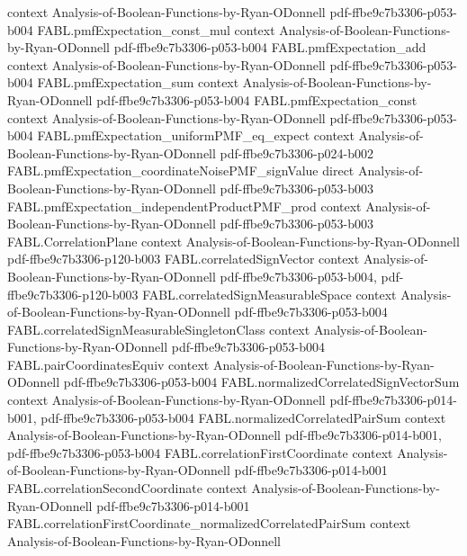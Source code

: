\begin{theorem}
  {context}
  {Analysis-of-Boolean-Functions-by-Ryan-ODonnell}
  {pdf-ffbe9c7b3306-p053-b004}
\proofstep
  {FABL.pmfExpectation_const_mul}
  {context}
  {Analysis-of-Boolean-Functions-by-Ryan-ODonnell}
  {pdf-ffbe9c7b3306-p053-b004}
\proofstep
  {FABL.pmfExpectation_add}
  {context}
  {Analysis-of-Boolean-Functions-by-Ryan-ODonnell}
  {pdf-ffbe9c7b3306-p053-b004}
\proofstep
  {FABL.pmfExpectation_sum}
  {context}
  {Analysis-of-Boolean-Functions-by-Ryan-ODonnell}
  {pdf-ffbe9c7b3306-p053-b004}
\proofstep
  {FABL.pmfExpectation_const}
  {context}
  {Analysis-of-Boolean-Functions-by-Ryan-ODonnell}
  {pdf-ffbe9c7b3306-p053-b004}
\proofstep
  {FABL.pmfExpectation_uniformPMF_eq_expect}
  {context}
  {Analysis-of-Boolean-Functions-by-Ryan-ODonnell}
  {pdf-ffbe9c7b3306-p024-b002}
\proofstep
  {FABL.pmfExpectation_coordinateNoisePMF_signValue}
  {direct}
  {Analysis-of-Boolean-Functions-by-Ryan-ODonnell}
  {pdf-ffbe9c7b3306-p053-b003}
\proofstep
  {FABL.pmfExpectation_independentProductPMF_prod}
  {context}
  {Analysis-of-Boolean-Functions-by-Ryan-ODonnell}
  {pdf-ffbe9c7b3306-p053-b003}
\proofstep
  {FABL.CorrelationPlane}
  {context}
  {Analysis-of-Boolean-Functions-by-Ryan-ODonnell}
  {pdf-ffbe9c7b3306-p120-b003}
\proofstep
  {FABL.correlatedSignVector}
  {context}
  {Analysis-of-Boolean-Functions-by-Ryan-ODonnell}
  {pdf-ffbe9c7b3306-p053-b004,
    pdf-ffbe9c7b3306-p120-b003}
\proofstep
  {FABL.correlatedSignMeasurableSpace}
  {context}
  {Analysis-of-Boolean-Functions-by-Ryan-ODonnell}
  {pdf-ffbe9c7b3306-p053-b004}
\proofstep
  {FABL.correlatedSignMeasurableSingletonClass}
  {context}
  {Analysis-of-Boolean-Functions-by-Ryan-ODonnell}
  {pdf-ffbe9c7b3306-p053-b004}
\proofstep
  {FABL.pairCoordinatesEquiv}
  {context}
  {Analysis-of-Boolean-Functions-by-Ryan-ODonnell}
  {pdf-ffbe9c7b3306-p053-b004}
\proofstep
  {FABL.normalizedCorrelatedSignVectorSum}
  {context}
  {Analysis-of-Boolean-Functions-by-Ryan-ODonnell}
  {pdf-ffbe9c7b3306-p014-b001,
    pdf-ffbe9c7b3306-p053-b004}
\proofstep
  {FABL.normalizedCorrelatedPairSum}
  {context}
  {Analysis-of-Boolean-Functions-by-Ryan-ODonnell}
  {pdf-ffbe9c7b3306-p014-b001,
    pdf-ffbe9c7b3306-p053-b004}
\proofstep
  {FABL.correlationFirstCoordinate}
  {context}
  {Analysis-of-Boolean-Functions-by-Ryan-ODonnell}
  {pdf-ffbe9c7b3306-p014-b001}
\proofstep
  {FABL.correlationSecondCoordinate}
  {context}
  {Analysis-of-Boolean-Functions-by-Ryan-ODonnell}
  {pdf-ffbe9c7b3306-p014-b001}
\proofstep
  {FABL.correlationFirstCoordinate_normalizedCorrelatedPairSum}
  {context}
  {Analysis-of-Boolean-Functions-by-Ryan-ODonnell}

\end{theorem}
